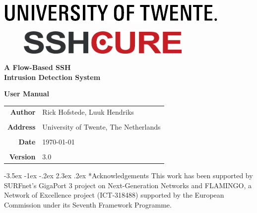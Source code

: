 \documentclass[a4paper,10pt]{article}
\makeatletter
\renewcommand\section{\@startsection {section}{1}{\z@}%
                   {-3.5ex \@plus -1ex \@minus -.2ex}%
                   {2.3ex \@plus.2ex}%
                   {\normalfont\sffamily\Large\bfseries\color{BrickRed}}}
\makeatother
\begin{document}
\pagestyle{empty}
\sffamily\Large

\begin{center}
	\vspace*{1cm} \includegraphics[width=0.7\linewidth]{img/UT_Logo_Black_RGB_EN}

	\vspace{3cm}
	\begin{figure}[!h]
		\centering
		\includegraphics[width=0.75\textwidth]{img/sshcure_logo.png}
	\end{figure}

	\vspace{4cm} {\Huge\bfseries A Flow-Based SSH \\[0.3cm] Intrusion Detection System}

	\vspace{1cm} {\LARGE\bfseries User Manual}
\end{center}

\vspace{3cm}

\begin{tabular}{rl}
	\bfseries Author & Rick Hofstede, Luuk Hendriks \\
	 & \\
	\bfseries Address &  University of Twente, The Netherlands \\
	 & \\
	\bfseries Date & \today \\
	 & \\
	\bfseries Version & 3.0
\end{tabular}

\cleardoublepage

\label{pdf_contents}
\pagestyle{fancy}

\normalsize
\tableofcontents

\newpage\cleardoublepage\normalfont

 \newpage
 \newpage
 \newpage




\section*{Acknowledgements}
This work has been supported by SURFnet's GigaPort 3 project on Next-Generation Networks and FLAMINGO, a Network of Excellence 
project (ICT-318488) supported by the European Commission under its Seventh Framework Programme.

\newpage



\label{totalpages}	%
\end{document}

